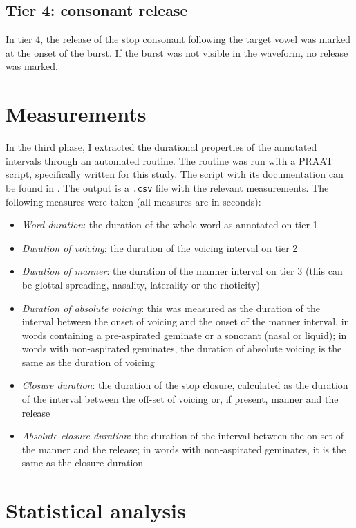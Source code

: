 \documentclass[11pt,a4paper,openany]{memoir}\usepackage[]{graphicx}\usepackage[]{color}
\begin{document}
\subsection{Tier 4: consonant release}
In tier 4, the release of the stop consonant following the target vowel was marked at the onset of the burst.
If the burst was not visible in the waveform, no release was marked.

\section{Measurements}
In the third phase, I extracted the durational properties of the annotated intervals through an automated routine.
The routine was run with a PRAAT script, specifically written for this study.
The script with its documentation can be found in .
The output is a \texttt{.csv} file with the relevant measurements.
The following measures were taken (all measures are in seconds):

\begin{itemize}
\item \textit{Word duration}: the duration of the whole word as annotated on tier 1
\item \textit{Duration of voicing}: the duration of the voicing interval on tier 2
\item \textit{Duration of manner}: the duration of the manner interval on tier 3 (this can be glottal spreading, nasality, laterality or the rhoticity)
\item \textit{Duration of absolute voicing}: this was measured as the duration of the interval between the onset of voicing and the onset of the manner interval, in words containing a pre-aspirated geminate or a sonorant (nasal or liquid); in words with non-aspirated geminates, the duration of absolute voicing is the same as the duration of voicing
\item \textit{Closure duration}: the duration of the stop closure, calculated as the duration of the interval between the off-set of voicing or, if present, manner and the release
\item \textit{Absolute closure duration}: the duration of the interval between the on-set of the manner and the release; in words with non-aspirated geminates, it is the same as the closure duration
\end{itemize}


\section{Statistical analysis}
\end{document}
